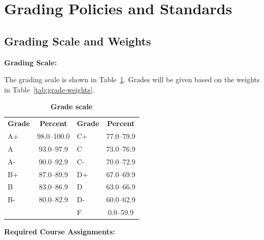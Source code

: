 \documentclass[12pt]{article}     %
\begin{document}
\section{Grading Policies and Standards}

\subsection*{Grading Scale and Weights}

\noindent \textbf{Grading Scale:}

The grading scale is shown in Table~\ref{tab:grading-scale}. Grades will be given based on the weights in Table~\ref{tab:grade-weights}.
\begin{center}
\begin{table}[h]
  \caption{\textbf{Grade scale}}
  \label{tab:grading-scale}
  \centering
  \begin{tabular}{l c l c}
  \rowcolor{gray!20}
  \textbf{Grade} & \textbf{Percent} & \textbf{Grade} & \textbf{Percent} \\
  A+    & 98.0--100.0& C+    & 77.0--79.9 \\
  A     & 93.0--97.9 & C     & 73.0--76.9 \\
  A-    & 90.0--92.9 & C-    & 70.0--72.9 \\
  B+    & 87.0--89.9 & D+    & 67.0--69.9 \\
  B     & 83.0--86.9 & D     & 63.0--66.9 \\
  B-    & 80.0--82.9 & D-    & 60.0--62.9 \\
        &            & F     & 0.0--59.9 \\
  \end{tabular}
\end{table}

\end{center}

\vspace{1em}
\noindent \textbf{Required Course Assignments:}
\end{document}
